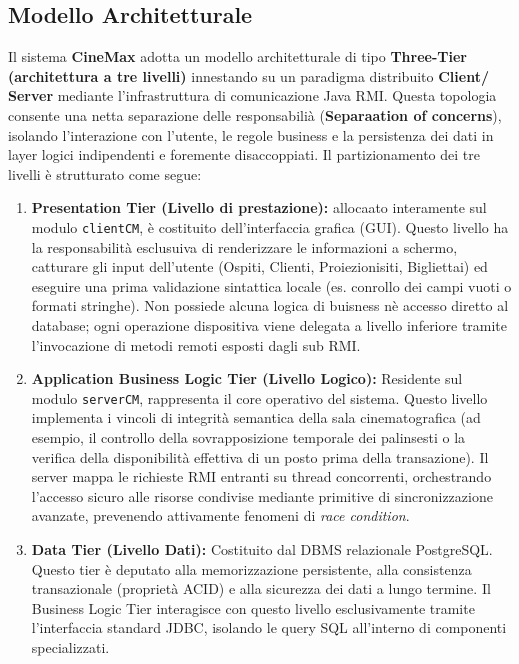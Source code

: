 \documentclass{article}
\begin{document}
\subsection{Modello Architetturale} 
Il sistema \textbf{CineMax} adotta un modello architetturale di tipo \textbf{Three-Tier (architettura a tre livelli)} innestando su un paradigma distribuito \textbf{Client/ Server} mediante l'infrastruttura di comunicazione Java RMI. Questa topologia consente una netta separazione delle responsabilià (\textbf{Separaation of concerns}), isolando l'interazione con l'utente, le regole business e la persistenza dei dati in layer logici indipendenti e foremente disaccoppiati.
Il partizionamento dei tre livelli è strutturato come segue:
\begin{enumerate}
    \item  \textbf{Presentation Tier (Livello di prestazione):} allocaato interamente sul modulo \texttt{clientCM}, è costituito dell'interfaccia grafica (GUI). Questo livello ha la responsabilità esclusuiva di renderizzare le informazioni a schermo, catturare gli input dell'utente (Ospiti, Clienti, Proiezionisiti, Bigliettai) ed eseguire una prima validazione sintattica locale (es. conrollo dei campi vuoti o formati stringhe). Non possiede alcuna logica di buisness nè accesso diretto al database; ogni operazione dispositiva viene delegata a livello inferiore tramite l'invocazione di metodi remoti esposti dagli sub RMI.
    \item \textbf{Application Business Logic Tier (Livello Logico):} Residente sul modulo \texttt{serverCM}, rappresenta il core operativo del sistema. Questo livello implementa i vincoli di integrità semantica della sala cinematografica (ad esempio, il controllo della sovrapposizione temporale dei palinsesti o la verifica della disponibilità effettiva di un posto prima della transazione). Il server mappa le richieste RMI entranti su thread concorrenti, orchestrando l'accesso sicuro alle risorse condivise mediante primitive di sincronizzazione avanzate, prevenendo attivamente fenomeni di \textit{race condition}.
    \item \textbf{Data Tier (Livello Dati):} Costituito dal DBMS relazionale PostgreSQL. Questo tier è deputato alla memorizzazione persistente, alla consistenza transazionale (proprietà ACID) e alla sicurezza dei dati a lungo termine. Il Business Logic Tier interagisce con questo livello esclusivamente tramite l'interfaccia standard JDBC, isolando le query SQL all'interno di componenti specializzati.
\end{enumerate}
\end{document}
